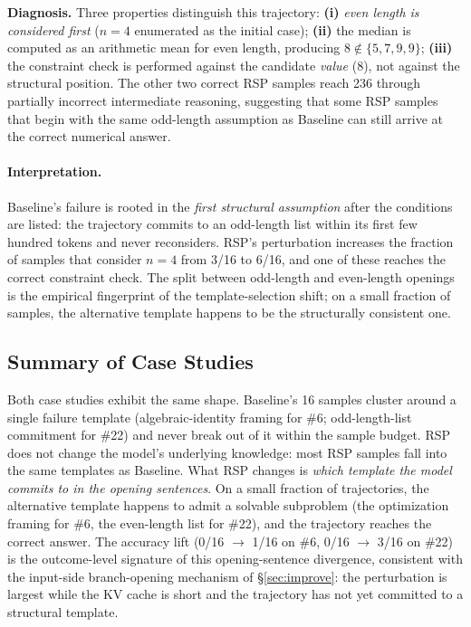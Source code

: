 \textbf{Diagnosis.} Three properties distinguish this trajectory: \textbf{(i)} \emph{even length is considered first} ($n = 4$ enumerated as the initial case); \textbf{(ii)} the median is computed as an arithmetic mean for even length, producing $8 \notin \{5, 7, 9, 9\}$; \textbf{(iii)} the constraint check is performed against the candidate \emph{value} ($8$), not against the structural position. The other two correct RSP samples reach 236 through partially incorrect intermediate reasoning, suggesting that some RSP samples that begin with the same odd-length assumption as Baseline can still arrive at the correct numerical answer.

\paragraph{Interpretation.} Baseline's failure is rooted in the \emph{first structural assumption} after the conditions are listed: the trajectory commits to an odd-length list within its first few hundred tokens and never reconsiders. RSP's perturbation increases the fraction of samples that consider $n = 4$ from 3/16 to 6/16, and one of these reaches the correct constraint check. The split between odd-length and even-length openings is the empirical fingerprint of the template-selection shift; on a small fraction of samples, the alternative template happens to be the structurally consistent one.

\subsection{Summary of Case Studies}\label{app:qualitative_summary}

Both case studies exhibit the same shape. Baseline's 16 samples cluster around a single failure template (algebraic-identity framing for \#6; odd-length-list commitment for \#22) and never break out of it within the sample budget. RSP does not change the model's underlying knowledge: most RSP samples fall into the same templates as Baseline. What RSP changes is \emph{which template the model commits to in the opening sentences}. On a small fraction of trajectories, the alternative template happens to admit a solvable subproblem (the optimization framing for \#6, the even-length list for \#22), and the trajectory reaches the correct answer. The accuracy lift (0/16 $\to$ 1/16 on \#6, 0/16 $\to$ 3/16 on \#22) is the outcome-level signature of this opening-sentence divergence, consistent with the input-side branch-opening mechanism of \S\ref{sec:improve}: the perturbation is largest while the KV cache is short and the trajectory has not yet committed to a structural template.

